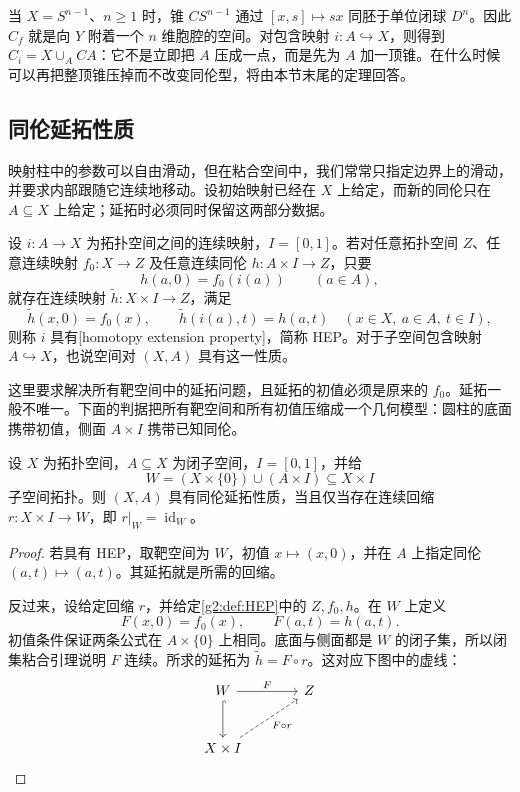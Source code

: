 当 \(X=S^{n-1}\)、\(n\ge1\) 时，锥 \(CS^{n-1}\) 通过 \([x,s]\mapsto sx\) 同胚于单位闭球 \(D^n\)。因此 \(C_f\) 就是向 \(Y\) 附着一个 \(n\) 维胞腔的空间。对包含映射 \(i:A\hookrightarrow X\)，则得到 \(C_i=X\cup_A CA\)：它不是立即把 \(A\) 压成一点，而是先为 \(A\) 加一顶锥。在什么时候可以再把整顶锥压掉而不改变同伦型，将由本节末尾的定理回答。

\subsection{同伦延拓性质}
\label{g2:subsec:0102:02}
映射柱中的参数可以自由滑动，但在粘合空间中，我们常常只指定边界上的滑动，并要求内部跟随它连续地移动。设初始映射已经在 \(X\) 上给定，而新的同伦只在 \(A\subseteq X\) 上给定；延拓时必须同时保留这两部分数据。

\begin{definition}[同伦延拓性质]\label{g2:def:HEP}
	设 \(i:A\to X\) 为拓扑空间之间的连续映射，\(I=[0,1]\)。若对任意拓扑空间 \(Z\)、任意连续映射 \(f_0:X\to Z\) 及任意连续同伦 \(h:A\times I\to Z\)，只要
	\[
		h(a,0)=f_0(i(a))\qquad(a\in A),
	\]
	就存在连续映射 \(\widetilde h:X\times I\to Z\)，满足
	\[
		\widetilde h(x,0)=f_0(x),\qquad
		\widetilde h(i(a),t)=h(a,t)
		\quad(x\in X,\ a\in A,\ t\in I),
	\]
	则称 \(i\) 具有[homotopy extension property]，简称 HEP。对于子空间包含映射 \(A\hookrightarrow X\)，也说空间对 \((X,A)\) 具有这一性质。
\end{definition}

这里要求解决所有靶空间中的延拓问题，且延拓的初值必须是原来的 \(f_0\)。延拓一般不唯一。下面的判据把所有靶空间和所有初值压缩成一个几何模型：圆柱的底面携带初值，侧面 \(A\times I\) 携带已知同伦。

\begin{proposition}\label{g2:prop:HEP-retraction}
	设 \(X\) 为拓扑空间，\(A\subseteq X\) 为闭子空间，\(I=[0,1]\)，并给
	\[
		W=(X\times\{0\})\cup(A\times I)\subseteq X\times I
	\]
	子空间拓扑。则 \((X,A)\) 具有同伦延拓性质，当且仅当存在连续回缩 \(r:X\times I\to W\)，即 \(r|_W=\operatorname{id}_W\)。
\end{proposition}
\begin{proof}
	若具有 HEP，取靶空间为 \(W\)，初值 \(x\mapsto(x,0)\)，并在 \(A\) 上指定同伦 \((a,t)\mapsto(a,t)\)。其延拓就是所需的回缩。

	反过来，设给定回缩 \(r\)，并给定\cref{g2:def:HEP}中的 \(Z,f_0,h\)。在 \(W\) 上定义
	\[
		F(x,0)=f_0(x),\qquad F(a,t)=h(a,t).
	\]
	初值条件保证两条公式在 \(A\times\{0\}\) 上相同。底面与侧面都是 \(W\) 的闭子集，所以闭集粘合引理说明 \(F\) 连续。所求的延拓为 \(\widetilde h=F\circ r\)。这对应下图中的虚线：
	\[
		\begin{tikzcd}[column sep=large,row sep=large]
			W \arrow[r,"F"] \arrow[d,hook] & Z \\
			X\times I \arrow[ur,dashed,"F\circ r"'] &
		\end{tikzcd}
	\]
\end{proof}

